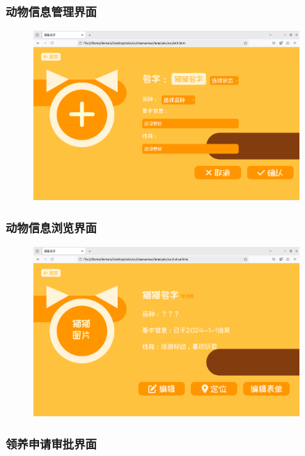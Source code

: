 \documentclass[12pt,a4paper,UTF8]{article}
\begin{document}
\subsubsection{动物信息管理界面}

\begin{figure}[H]
  \centering
  \includegraphics[width=0.9\textwidth]{figures/AnimalInfo4.png}
\end{figure}

\subsubsection{动物信息浏览界面}

\begin{figure}[H]
  \centering
  \includegraphics[width=0.9\textwidth]{figures/AnimalInfo3.png}
\end{figure}

\subsubsection{领养申请审批界面}
\end{document}
